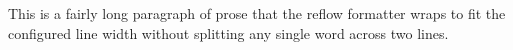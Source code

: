 This is a fairly long paragraph of prose that the reflow formatter wraps to fit the configured line width without splitting any single word across two lines.
